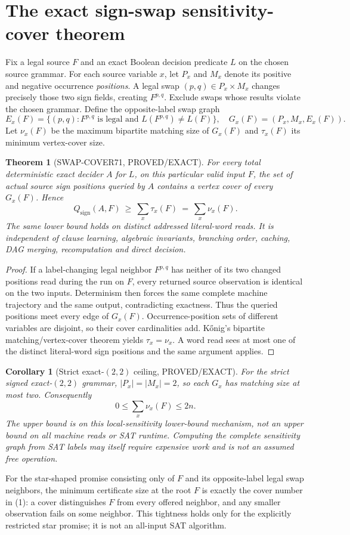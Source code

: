 \documentclass[11pt]{article}
\newtheorem{theorem}{Theorem}
\newtheorem{corollary}{Corollary}
\begin{document}
\section{The exact sign-swap sensitivity-cover theorem}
Fix a legal source $F$ and an exact Boolean decision predicate $L$ on the chosen source grammar. For each source variable $x$, let $P_x$ and $M_x$ denote its positive and negative occurrence \emph{positions}. A legal swap $(p,q)\in P_x\times M_x$ changes precisely those two sign fields, creating $F^{p,q}$. Exclude swaps whose results violate the chosen grammar. Define the opposite-label swap graph
\[
 E_x(F)=\{(p,q):F^{p,q}\text{ is legal and }L(F^{p,q})\ne L(F)\},
 \quad G_x(F)=(P_x,M_x,E_x(F)).
\]
Let $\nu_x(F)$ be the maximum bipartite matching size of $G_x(F)$ and $\tau_x(F)$ its minimum vertex-cover size.

\begin{theorem}[SWAP-COVER71, PROVED/EXACT]
For every total deterministic exact decider $A$ for $L$, on this particular valid input $F$, the set of actual source sign positions queried by $A$ contains a vertex cover of every $G_x(F)$. Hence
\[
  Q_{\mathrm{sign}}(A,F)\ \ge\ \sum_x\tau_x(F)
  \ =\ \sum_x\nu_x(F).
\tag{1}
\]
The same lower bound holds on distinct addressed literal-word reads. It is independent of clause learning, algebraic invariants, branching order, caching, DAG merging, recomputation and direct decision.
\end{theorem}
\begin{proof}
If a label-changing legal neighbor $F^{p,q}$ has neither of its two changed positions read during the run on $F$, every returned source observation is identical on the two inputs. Determinism then forces the same complete machine trajectory and the same output, contradicting exactness. Thus the queried positions meet every edge of $G_x(F)$. Occurrence-position sets of different variables are disjoint, so their cover cardinalities add. K\H{o}nig's bipartite matching/vertex-cover theorem yields $\tau_x=\nu_x$. A word read sees at most one of the distinct literal-word sign positions and the same argument applies.
\end{proof}
\begin{corollary}[Strict exact-$(2,2)$ ceiling, PROVED/EXACT]
For the strict signed exact-$(2,2)$ grammar, $|P_x|=|M_x|=2$, so each $G_x$ has matching size at most two. Consequently
\[
     0\le \sum_x\nu_x(F)\le 2n.
\tag{2}
\]
The upper bound is on \emph{this local-sensitivity lower-bound mechanism}, not an upper bound on all machine reads or SAT runtime. Computing the complete sensitivity graph from SAT labels may itself require expensive work and is not an assumed free operation.
\end{corollary}
For the star-shaped promise consisting only of $F$ and its opposite-label legal swap neighbors, the minimum certificate size at the root $F$ is exactly the cover number in (1): a cover distinguishes $F$ from every offered neighbor, and any smaller observation fails on some neighbor. This tightness holds only for the explicitly restricted star promise; it is not an all-input SAT algorithm.
\end{document}
